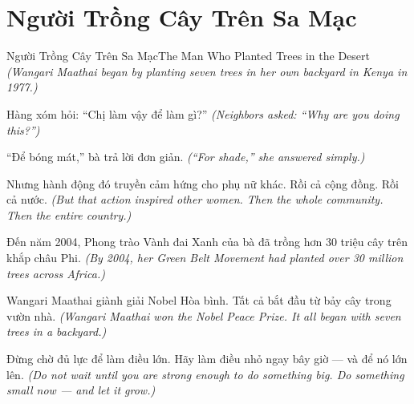 \section{Người Trồng Cây Trên Sa Mạc}
\begin{truyen}{Người Trồng Cây Trên Sa Mạc}{The Man Who Planted Trees in the Desert}
\textit{(Wangari Maathai began by planting seven trees in her own backyard in Kenya in 1977.)}

Hàng xóm hỏi: ``Chị làm vậy để làm gì?''
\textit{(Neighbors asked: ``Why are you doing this?'')}

``Để bóng mát,'' bà trả lời đơn giản.
\textit{(``For shade,'' she answered simply.)}

Nhưng hành động đó truyền cảm hứng cho phụ nữ khác. Rồi cả cộng đồng. Rồi cả nước.
\textit{(But that action inspired other women. Then the whole community. Then the entire country.)}

Đến năm 2004, Phong trào Vành đai Xanh của bà đã trồng hơn 30 triệu cây trên khắp châu Phi.
\textit{(By 2004, her Green Belt Movement had planted over 30 million trees across Africa.)}

Wangari Maathai giành giải Nobel Hòa bình. Tất cả bắt đầu từ bảy cây trong vườn nhà.
\textit{(Wangari Maathai won the Nobel Peace Prize. It all began with seven trees in a backyard.)}

\end{truyen}

\begin{baihoc}
Đừng chờ đủ lực để làm điều lớn. Hãy làm điều nhỏ ngay bây giờ — và để nó lớn lên.
\textit{(Do not wait until you are strong enough to do something big. Do something small now — and let it grow.)}
\end{baihoc}
\ngancach

